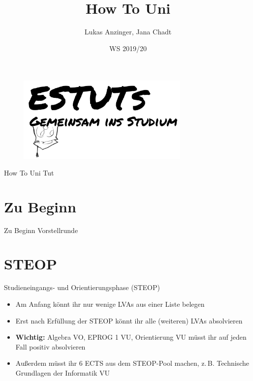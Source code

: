 \documentclass{beamer}
\title{How To Uni}
\date{WS 2019/20}
\author{Lukas Anzinger, Jana Chadt}
\begin{document}
\begin{frame}
    \begin{figure}[htp]
        \centering
        \includegraphics[width=0.75\textwidth]{eule_text.png}
    \end{figure}
    \maketitle
\end{frame}

\begin{frame}{How To Uni Tut}
    \setcounter{tocdepth}{1}
    \tableofcontents
\end{frame}

\section*{Zu Beginn}
\begin{frame}{Zu Beginn}
    Vorstellrunde
\end{frame}

\section{STEOP}
\begin{frame}{Studieneingangs- und Orientierungsphase (STEOP)}
    \begin{itemize}
        \item Am Anfang könnt ihr nur wenige LVAs aus einer Liste belegen
        \item Erst nach Erfüllung der STEOP könnt ihr alle (weiteren) LVAs
              absolvieren
        \item \textbf{Wichtig:} Algebra VO, EPROG 1 VU, Orientierung VU
              müsst ihr auf jeden Fall positiv absolvieren
        \item Außerdem müsst ihr 6 ECTS aus dem STEOP-Pool machen,
              z.\,B. Technische Grundlagen der Informatik VU
    \end{itemize}
\end{frame}
\end{document}
